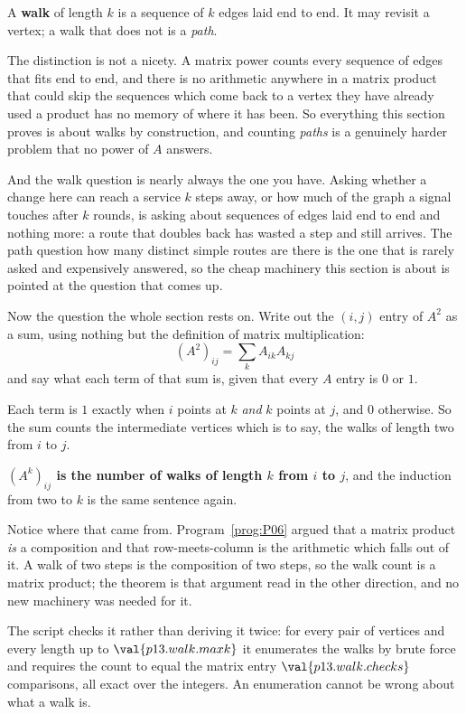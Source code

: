 \begin{fr}
A \textbf{walk} of length $k$ is a sequence of $k$ edges laid end to end. It
may revisit a vertex; a walk that does not is a \emph{path}.

The distinction is not a nicety. A matrix power counts every sequence of
edges that fits end to end, and there is no arithmetic anywhere in a matrix
product that could skip the sequences which come back to a vertex they have
already used \dash{} a product has no memory of where it has been. So
everything this section proves is about walks by construction, and counting
\emph{paths} is a genuinely harder problem that no power of $A$ answers.

And the walk question is nearly always the one you have. Asking whether a
change here can reach a service $k$ steps away, or how much of the graph a
signal touches after $k$ rounds, is asking about sequences of edges laid end
to end and nothing more: a route that doubles back has wasted a step and
still arrives. The path question \dash{} how many distinct simple routes are
there \dash{} is the one that is rarely asked and expensively answered, so
the cheap machinery this section is about is pointed at the question that
comes up.

Now the question the whole section rests on. Write out the $(i,j)$ entry of
$A^{2}$ as a sum, using nothing but the definition of matrix multiplication:
\[ (A^{2})_{ij} = \sum_{k} A_{ik}A_{kj} \]
and say what each term of that sum is, given that every $A$ entry is $0$ or
$1$.
\dotline
\nextframe
\end{fr}

\begin{fr}
\begin{ansblock}
Each term is $1$ exactly when $i$ points at $k$ \emph{and} $k$ points at $j$,
and $0$ otherwise. So the sum counts the intermediate vertices \dash{} which
is to say, the walks of length two from $i$ to $j$.
\end{ansblock}

\textbf{$(A^{k})_{ij}$ is the number of walks of length $k$ from $i$ to $j$},
and the induction from two to $k$ is the same sentence again.

Notice where that came from. Program~\ref{prog:P06} argued that a matrix
product \emph{is} a composition and that row-meets-column is the arithmetic
which falls out of it. A walk of two steps is the composition of two steps,
so the walk count is a matrix product; the theorem is that argument read in
the other direction, and no new machinery was needed for it.

\begin{note}
The script checks it rather than deriving it twice: for every pair of vertices
and every length up to $\val{p13.walk.maxk}$ it enumerates the walks by brute
force and requires the count to equal the matrix entry \dash{}
$\val{p13.walk.checks}$ comparisons, all exact over the integers. An
enumeration cannot be wrong about what a walk is.
\end{note}
\end{fr}


